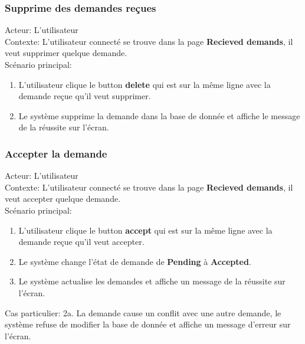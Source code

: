 \documentclass[14px]{article}
\begin{document}
\subsubsection{Supprime des demandes reçues}
Acteur: L'utilisateur\\
Contexte: L'utilisateur connecté se trouve dans la page \textbf{Recieved demands}, il veut supprimer quelque demande.\\
Scénario principal:
\begin{enumerate}
	\item L'utilisateur clique le button \textbf{delete} qui est sur la même ligne avec la demande reçue qu'il veut supprimer.
	\item Le système supprime la demande dans la base de donnée et affiche le message de la réussite sur l'écran.
\end{enumerate}

\subsubsection{Accepter la demande}
Acteur: L'utilisateur\\
Contexte: L'utilisateur connecté se trouve dans la page \textbf{Recieved demands}, il veut accepter quelque demande.\\
Scénario principal:
\begin{enumerate}
	\item L'utilisateur clique le button \textbf{accept} qui est sur la même ligne avec la demande reçue qu'il veut accepter.
	\item Le système change l'état de demande de \textbf{Pending} à \textbf{Accepted}.
	\item Le système actualise les demandes et affiche un message de la réussite sur l'écran.
\end{enumerate}
Cas particulier:
2a. La demande cause un conflit avec une autre demande, le système refuse de modifier la base de donnée et affiche un message d'erreur sur l'écran.
\end{document}
